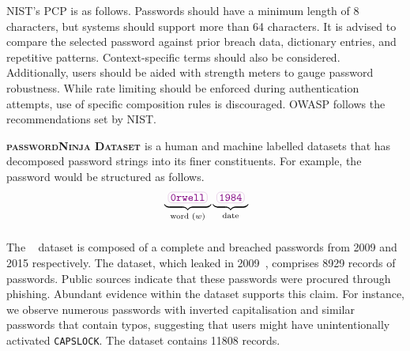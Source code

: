 NIST's \cite{Grassi_Garcia_Fenton_2020} PCP is as follows. Passwords should have a minimum length of 8 characters, but systems should support more than 64 characters. It is advised to compare the selected password against prior breach data, dictionary entries, and repetitive patterns. Context-specific terms should also be considered. Additionally, users should be aided with strength meters to gauge password robustness. While rate limiting should be enforced during authentication attempts, use of specific composition rules is discouraged.
OWASP \cite{owasp_owasp_2024} follows the recommendations set by NIST.

\textbf{\textsc{passwordNinja Dataset \cite{almasi2024passwordninja}}} is a human and machine labelled datasets that has decomposed password strings into its finer constituents. For example, the password  would be structured as follows.
\[
\begin{aligned}
& \underbrace{\text{\password{0rwell}}}_{\text{word }(w)} \underbrace{\text{\password{1984}}}_{\text{date}} \\[10pt]
\end{aligned}
\vspace*{-0.3cm}
\]
The ~\cite{almasi2024passwordninja} dataset is composed of a complete \hmail and \lizardsquad breached passwords from 2009 and 2015 respectively. The \hmail dataset, which leaked in 2009~\cite{johnson_hotmail_2009}, comprises \num{8929} records of passwords. Public sources indicate that these passwords were procured through phishing. Abundant evidence within the dataset supports this claim. For instance, we observe numerous passwords with inverted capitalisation and similar passwords that contain typos, suggesting that users might have unintentionally activated \texttt{CAPS\;LOCK}. The \lizardsquadnocite dataset contains \num{11808} records.